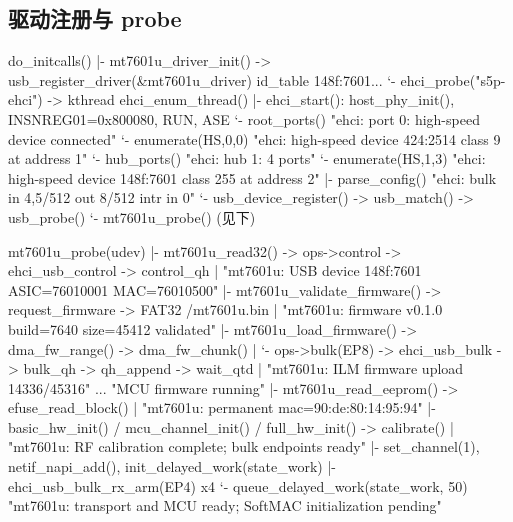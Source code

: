 \documentclass[UTF8,zihao=-4,fontset=none]{ctexart}
\begin{document}
\subsection{驱动注册与 probe}
\begin{code}
do_initcalls()
 |- mt7601u_driver_init() -> usb_register_driver(&mt7601u_driver)   id_table 148f:7601...
 `- ehci_probe("s5p-ehci") -> kthread ehci_enum_thread()
     |- ehci_start(): host_phy_init(), INSNREG01=0x800080, RUN, ASE
     `- root_ports()               "ehci: port 0: high-speed device connected"
         `- enumerate(HS,0,0)      "ehci: high-speed device 424:2514 class 9 at address 1"
             `- hub_ports()        "ehci: hub 1: 4 ports"
                 `- enumerate(HS,1,3)
                      "ehci: high-speed device 148f:7601 class 255 at address 2"
                     |- parse_config()  "ehci:   bulk in 4,5/512 out 8/512 intr in 0"
                     `- usb_device_register() -> usb_match() -> usb_probe()
                         `- mt7601u_probe()   (见下)

mt7601u_probe(udev)
 |- mt7601u_read32() -> ops->control -> ehci_usb_control -> control_qh
 |        "mt7601u: USB device 148f:7601 ASIC=76010001 MAC=76010500"
 |- mt7601u_validate_firmware() -> request_firmware -> FAT32 /mt7601u.bin
 |        "mt7601u: firmware v0.1.0 build=7640 size=45412 validated"
 |- mt7601u_load_firmware() -> dma_fw_range() -> dma_fw_chunk()
 |   `- ops->bulk(EP8) -> ehci_usb_bulk -> bulk_qh -> qh_append -> wait_qtd
 |        "mt7601u: ILM firmware upload 14336/45316" ... "MCU firmware running"
 |- mt7601u_read_eeprom() -> efuse_read_block()
 |        "mt7601u: permanent mac=90:de:80:14:95:94"
 |- basic_hw_init() / mcu_channel_init() / full_hw_init() -> calibrate()
 |        "mt7601u: RF calibration complete; bulk endpoints ready"
 |- set_channel(1), netif_napi_add(), init_delayed_work(state_work)
 |- ehci_usb_bulk_rx_arm(EP4) x4
 `- queue_delayed_work(state_work, 50)
          "mt7601u: transport and MCU ready; SoftMAC initialization pending"
\end{code}
\end{document}
